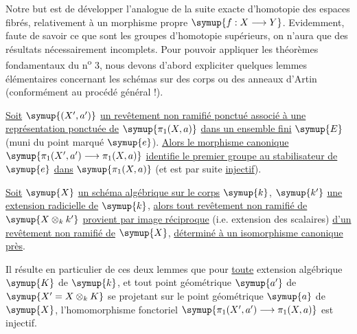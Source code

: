 Notre but est de développer l'analogue de la suite exacte d'homotopie des
espaces fibrés, relativement à un morphisme propre $\symup{f:X\longrightarrow Y}$.
Evidemment, faute de savoir ce que sont les groupes d'homotopie supérieurs, on
n'aura que des résultats nécessairement incomplets. Pour pouvoir appliquer les
théorèmes fondamentaux du n\textsuperscript{o} 3, nous devons d'abord expliciter
quelques lemmes élémentaires concernant les schémas sur des corps ou des
anneaux d'Artin (conformément au procédé général !).

 \uline{Soit} $\symup{(X',a')}$ \uline{un revêtement non ramifié ponctué associé à
une représentation ponctuée de} $\symup{\pi_1(X,a)}$ \uline{dans un ensemble fini} $\symup{E}$ (muni du
point marqué $\symup{e}$). \uline{Alors le morphisme canonique}
$\symup{\pi_1(X',a')\longrightarrow\pi_1(X,a)}$ \uline{identifie le premier groupe au
stabilisateur de} $\symup{e}$ \uline{dans} $\symup{\pi_1(X,a)}$ (et est par suite \uline{injectif}).

 \uline{Soit} $\symup{X}$ \uline{un schéma algébrique sur le corps} $\symup{k}$, $\symup{k'}$ \uline{une
extension radicielle de} $\symup{k}$, \uline{alors tout revêtement non ramifié de}
$\symup{X\otimes_k k'}$ \uline{provient par image réciproque} (i.e. extension des scalaires)
\uline{d'un revêtement non ramifié de} $\symup{X}$, \uline{déterminé à un isomorphisme canonique près}.

Il résulte en particulier de ces deux lemmes que pour \uline{toute} extension
algébrique $\symup{K}$ de $\symup{k}$, et tout point géométrique $\symup{a'}$ de
$\symup{X'=X\otimes_k K}$ se projetant sur le point géométrique $\symup{a}$ de $\symup{X}$,
l'homomorphisme fonctoriel
$\symup{\pi_1(X',a')\longrightarrow\pi_1(X,a)}$ est injectif.

